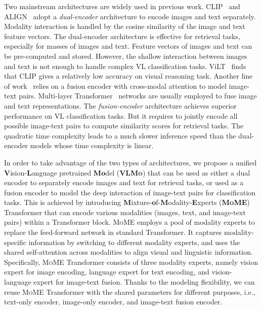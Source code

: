 \documentclass{article}
\newcommand\our{\textsc{VLMo}}
\newcommand\mome{\textsc{MoME}}
\begin{document}
Two mainstream architectures are widely used in previous work. 
CLIP~\citep{clip} and ALIGN~\citep{align} adopt a \textit{dual-encoder} architecture to encode images and text separately. 
Modality interaction is handled by the cosine similarity of the image and text feature vectors.
The dual-encoder architecture is effective for retrieval tasks, especially for masses of images and text.
Feature vectors of images and text can be pre-computed and stored.
However, the shallow interaction between images and text is not enough to handle complex VL classification tasks.
ViLT~\citep{vilt} finds that CLIP gives a relatively low accuracy on visual reasoning task.
Another line of work~\citep{vilbert,vl-bert,lxmert,uniter,vilt,albef} relies on a fusion encoder with cross-modal attention to model image-text pairs.
Multi-layer Transformer~\citep{transformer} networks are usually employed to fuse image and text representations.
The \textit{fusion-encoder} architecture achieves superior performance on VL classification tasks.
But it requires to jointly encode all possible image-text pairs to compute similarity scores for retrieval tasks.
The quadratic time complexity leads to a much slower inference speed than the dual-encoder models whose time complexity is linear.

In order to take advantage of the two types of architectures, we propose a unified \textbf{V}ision-\textbf{L}anguage pretrained \textbf{Mo}del (\textbf{\our{}}) that can be used as either a dual encoder to separately encode images and text for retrieval tasks, or used as a fusion encoder to model the deep interaction of image-text pairs for classification tasks.
This is achieved by introducing \textbf{M}ixture-\textbf{o}f-\textbf{M}odality-\textbf{E}xperts (\textbf{\mome{}}) Transformer that can encode various modalities (images, text, and image-text pairs) within a Transformer block.
\mome{} employs a pool of modality experts to replace the feed-forward network in standard Transformer.
It captures modality-specific information by switching to different modality experts, and uses the shared self-attention across modalities to align visual and linguistic information.
Specifically, \mome{} Transformer consists of three modality experts, namely vision expert for image encoding, language expert for text encoding, and vision-language expert for image-text fusion.
Thanks to the modeling flexibility, we can reuse \mome{} Transformer with the shared parameters for different purposes, i.e., text-only encoder, image-only encoder, and image-text fusion encoder.
\end{document}
